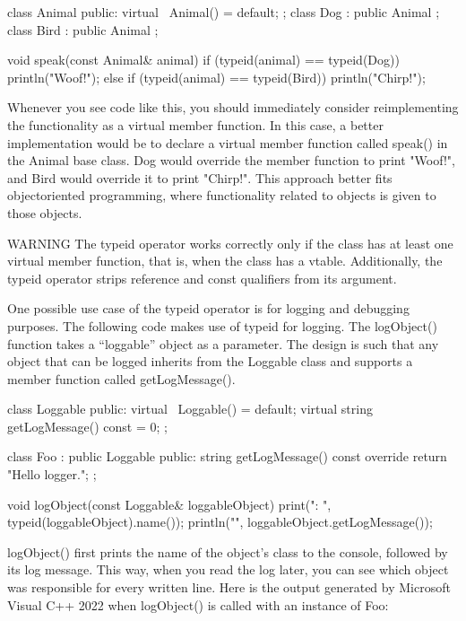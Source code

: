 \begin{cpp}
class Animal { public: virtual ~Animal() = default; };
class Dog : public Animal {};
class Bird : public Animal {};

void speak(const Animal& animal)
{
    if (typeid(animal) == typeid(Dog)) {
        println("Woof!");
    } else if (typeid(animal) == typeid(Bird)) {
        println("Chirp!");
    }
}
\end{cpp}

Whenever you see code like this, you should immediately consider reimplementing the functionality as a virtual member function. In this case, a better implementation would be to declare a virtual member function called speak() in the Animal base class. Dog would override the member function to print "Woof!", and Bird would override it to print "Chirp!". This approach better fits objectoriented programming, where functionality related to objects is given to those objects.

\begin{myWarning}{WARNING}
 The typeid operator works correctly only if the class has at least one virtual member function, that is, when the class has a vtable. Additionally, the typeid operator strips reference and const qualifiers from its argument.
\end{myWarning}

One possible use case of the typeid operator is for logging and debugging purposes. The following code makes use of typeid for logging. The logObject() function takes a “loggable” object as a parameter. The design is such that any object that can be logged inherits from the Loggable class and supports a member function called getLogMessage().

\begin{cpp}
class Loggable
{
    public:
        virtual ~Loggable() = default;
        virtual string getLogMessage() const = 0;
};

class Foo : public Loggable
{
    public:
        string getLogMessage() const override { return "Hello logger."; }
};

void logObject(const Loggable& loggableObject)
{
    print("{}: ", typeid(loggableObject).name());
    println("{}", loggableObject.getLogMessage());
}
\end{cpp}

logObject() first prints the name of the object’s class to the console, followed by its log message.
This way, when you read the log later, you can see which object was responsible for every written line. Here is the output generated by Microsoft Visual C++ 2022 when logObject() is called with an instance of Foo:

